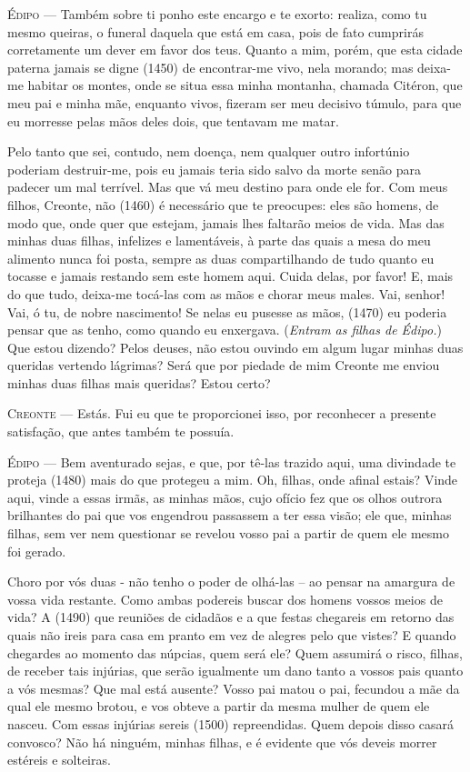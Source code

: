 \textsc{Édipo} --- Também sobre ti ponho este encargo e te exorto: realiza, como tu mesmo
queiras, o funeral daquela que está em casa, pois de fato cumprirás
corretamente um dever em favor dos teus. Quanto a mim, porém, que esta
cidade paterna jamais se digne (1450) de encontrar-me vivo, nela
morando; mas deixa-me habitar os montes, onde se situa essa minha
montanha, chamada Citéron, que meu pai e minha mãe, enquanto vivos,
fizeram ser meu decisivo túmulo, para que eu morresse pelas mãos deles
dois, que tentavam me matar.

Pelo tanto que sei, contudo, nem doença, nem qualquer outro infortúnio
poderiam destruir-me, pois eu jamais teria sido salvo da morte senão
para padecer um mal terrível. Mas que vá meu destino para onde ele for.
Com meus filhos, Creonte, não (1460) é necessário que te preocupes: eles
são homens, de modo que, onde quer que estejam, jamais lhes faltarão
meios de vida. Mas das minhas duas filhas, infelizes e lamentáveis, à
parte das quais a mesa do meu alimento nunca foi posta, sempre as duas
compartilhando de tudo quanto eu tocasse e jamais restando sem este
homem aqui. Cuida delas, por favor! E, mais do que tudo, deixa-me
tocá-las com as mãos e chorar meus males. Vai, senhor! Vai, ó tu, de
nobre nascimento! Se nelas eu pusesse as mãos, (1470) eu poderia pensar
que as tenho, como quando eu enxergava. (\emph{Entram as filhas de
Édipo.}) Que estou dizendo? Pelos deuses, não estou ouvindo em algum
lugar minhas duas queridas vertendo lágrimas? Será que por piedade de
mim Creonte me enviou minhas duas filhas mais queridas? Estou certo?

\textsc{Creonte} --- Estás. Fui eu que te proporcionei isso, por reconhecer a presente
satisfação, que antes também te possuía.

\textsc{Édipo} --- Bem aventurado sejas, e que, por tê-las trazido aqui, uma divindade te
proteja (1480) mais do que protegeu a mim. Oh, filhas, onde afinal
estais? Vinde aqui, vinde a essas irmãs, as minhas mãos, cujo ofício fez
que os olhos outrora brilhantes do pai que vos engendrou passassem a ter
essa visão; ele que, minhas filhas, sem ver nem questionar se revelou
vosso pai a partir de quem ele mesmo foi gerado.

Choro por vós duas - não tenho o poder de olhá-las -- ao pensar na
amargura de vossa vida restante. Como ambas podereis buscar dos homens
vossos meios de vida? A (1490) que reuniões de cidadãos e a que festas
chegareis em retorno das quais não ireis para casa em pranto em vez de
alegres pelo que vistes? E quando chegardes ao momento das núpcias, quem
será ele? Quem assumirá o risco, filhas, de receber tais injúrias, que
serão igualmente um dano tanto a vossos pais quanto a vós mesmas? Que
mal está ausente? Vosso pai matou o pai, fecundou a mãe da qual ele
mesmo brotou, e vos obteve a partir da mesma mulher de quem ele nasceu.
Com essas injúrias sereis (1500) repreendidas. Quem depois disso casará
convosco? Não há ninguém, minhas filhas, e é evidente que vós deveis
morrer estéreis e solteiras.

